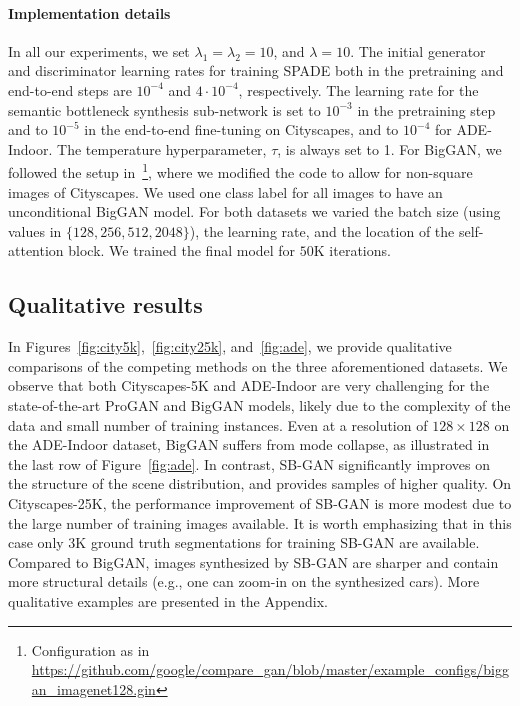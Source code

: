\documentclass[10pt,twocolumn,letterpaper]{article}
\begin{document}
\paragraph{Implementation details} In all our experiments, we set $\lambda_1 = \lambda_2 = 10$, and $\lambda = 10$. The initial generator and discriminator learning rates for training SPADE both in the pretraining and end-to-end steps are $10^{-4}$ and $4\cdot10^{-4}$, respectively. The learning rate for the semantic bottleneck synthesis sub-network is set to $10^{-3}$ in the pretraining step and to $10^{-5}$ in the end-to-end fine-tuning on Cityscapes, and to $10^{-4}$ for ADE-Indoor. The temperature hyperparameter, $\tau$, is always set to 1.
For BigGAN, we followed the setup in~\cite{luvcic2019high}\footnote{Configuration as in \url{https://github.com/google/compare_gan/blob/master/example_configs/biggan_imagenet128.gin}}, where we modified the code to allow for non-square images of Cityscapes. We used one class label for all images to have an unconditional BigGAN model. For both datasets we varied the batch size (using values in $\{128, 256, 512, 2048\}$), the learning rate, and the location of the self-attention block. We trained the final model for $50$K iterations.

\subsection{Qualitative results}
In Figures~\ref{fig:city5k},~\ref{fig:city25k}, and~\ref{fig:ade}, we provide qualitative comparisons of the competing methods on the three aforementioned datasets. We observe that both Cityscapes-5K and ADE-Indoor are very challenging for the state-of-the-art ProGAN and BigGAN models, likely due to the complexity of the data and small number of training instances. Even at a resolution of $128\times 128$ on the ADE-Indoor dataset, BigGAN suffers from mode collapse, as illustrated in the last row of Figure~\ref{fig:ade}. In contrast, SB-GAN significantly improves on the structure of the scene distribution, and provides samples of higher quality. On Cityscapes-25K, the performance improvement of SB-GAN is more modest due to the large number of training images available. It is worth emphasizing that in this case only 3K ground truth segmentations for training SB-GAN are available. Compared to BigGAN, images synthesized by SB-GAN are sharper and contain more structural details (e.g., one can zoom-in on the synthesized cars). More qualitative examples are presented in the Appendix.
\end{document}

